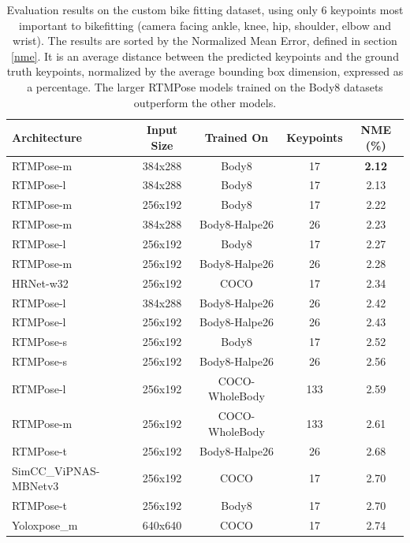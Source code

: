 \begin{table}[htbp]
    \begin{tabular}{l cccc}
        \toprule
        Architecture          & Input Size & Trained On     & Keypoints & NME (\%)      \\
        \midrule
        RTMPose-m             & 384x288    & Body8          & 17        & \textbf{2.12} \\
        RTMPose-l             & 384x288    & Body8          & 17        & 2.13          \\
        RTMPose-m             & 256x192    & Body8          & 17        & 2.22          \\
        RTMPose-m             & 384x288    & Body8-Halpe26  & 26        & 2.23          \\
        RTMPose-l             & 256x192    & Body8          & 17        & 2.27          \\
        RTMPose-m             & 256x192    & Body8-Halpe26  & 26        & 2.28          \\
        HRNet-w32             & 256x192    & COCO           & 17        & 2.34          \\
        RTMPose-l             & 384x288    & Body8-Halpe26  & 26        & 2.42          \\
        RTMPose-l             & 256x192    & Body8-Halpe26  & 26        & 2.43          \\
        RTMPose-s             & 256x192    & Body8          & 17        & 2.52          \\
        RTMPose-s             & 256x192    & Body8-Halpe26  & 26        & 2.56          \\
        RTMPose-l             & 256x192    & COCO-WholeBody & 133       & 2.59          \\
        RTMPose-m             & 256x192    & COCO-WholeBody & 133       & 2.61          \\
        RTMPose-t             & 256x192    & Body8-Halpe26  & 26        & 2.68          \\
        SimCC\_ViPNAS-MBNetv3 & 256x192    & COCO           & 17        & 2.70          \\
        RTMPose-t             & 256x192    & Body8          & 17        & 2.70          \\
        Yoloxpose\_m          & 640x640    & COCO           & 17        & 2.74          \\
        \bottomrule
    \end{tabular}
    \caption{Evaluation results on the custom bike fitting dataset, using only 6 keypoints most important to bikefitting (camera facing ankle, knee, hip, shoulder, elbow and wrist). The results are sorted by the Normalized Mean Error, defined in section \ref{nme}. It is an average distance between the predicted keypoints and the ground truth keypoints, normalized by the average bounding box dimension, expressed as a percentage. The larger RTMPose models trained on the Body8 datasets outperform the other models.}
    \label{tab:evaluation_results_all}

\end{table}

